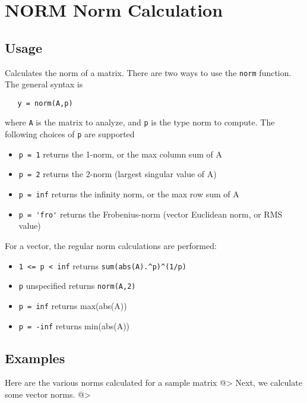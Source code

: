 \section{NORM Norm Calculation}

\subsection{Usage}

Calculates the norm of a matrix.  There are two ways to
use the \verb|norm| function.  The general syntax is
\begin{verbatim}
   y = norm(A,p)
\end{verbatim}
where \verb|A| is the matrix to analyze, and \verb|p| is the
type norm to compute.  The following choices of \verb|p|
are supported
\begin{itemize}
\item  \verb|p = 1| returns the 1-norm, or the max column sum of A

\item  \verb|p = 2| returns the 2-norm (largest singular value of A)

\item  \verb|p = inf| returns the infinity norm, or the max row sum of A

\item  \verb|p = 'fro'| returns the Frobenius-norm (vector Euclidean norm, or RMS value)

\end{itemize}
For a vector, the regular norm calculations are performed:
\begin{itemize}
\item  \verb|1 <= p < inf| returns \verb|sum(abs(A).^p)^(1/p)|

\item  \verb|p| unspecified returns \verb|norm(A,2)|

\item  \verb|p = inf| returns max(abs(A))

\item  \verb|p = -inf| returns min(abs(A))

\end{itemize}
\subsection{Examples}

Here are the various norms calculated for a sample matrix
@>
Next, we calculate some vector norms.
@>
